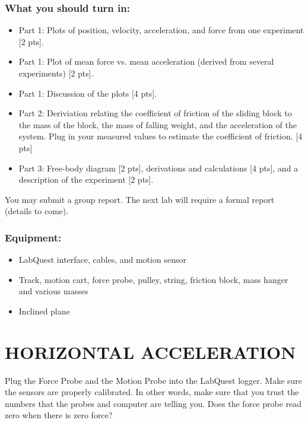 \documentclass[11pt,letterpaper]{article}
\begin{document}
\subsubsection*{What you should turn in:}
\begin{itemize}
\setlength{\parskip}{3pt}
\item Part 1: Plots of position, velocity, acceleration, and force from one experiment [2 pts].
\item Part 1: Plot of mean force vs. mean acceleration (derived from several experiments) [2 pts].
\item Part 1: Discussion of the plots [4 pts].
\item Part 2: Deriviation relating the coefficient of friction of the sliding block to the mass of the block, the mass of falling weight, and the acceleration of the system. Plug in your measured values to estimate the coefficient of friction. [4 pts]
\item Part 3: Free-body diagram [2 pts], derivations and calculations [4 pts], and a description of the experiment [2 pts].
\end{itemize}
You may submit a group report. The next lab will require a formal report (details to come). 

\subsubsection*{Equipment:}
\begin{itemize}
\setlength{\parskip}{3pt}
\item LabQuest interface, cables, and motion sensor
\item Track, motion cart, force probe, pulley, string, friction block, mass hanger and various masses
\item Inclined plane
\end{itemize}



\section{HORIZONTAL ACCELERATION} 
Plug the Force Probe and the Motion Probe into the LabQuest logger. Make sure the sensors are properly calibrated. In other words, make sure that you trust the numbers that the probes and computer are telling you. Does the force probe read zero when there is zero force?
\end{document}
